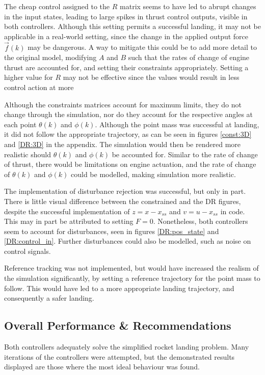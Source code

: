 \documentclass[conference, tikz]{IEEEtran}
\begin{document}
The cheap control assigned to the $R$ matrix seems to have led to abrupt changes in the input states, leading to large spikes in thrust control outputs, visible in both controllers. Although this setting permits a successful landing, it may not be applicable in a real-world setting, since the change in the applied output force $\vec f(k)$ may be dangerous. A way to mitigate this could be to add more detail to the original model, modifying $A$ and $B$ such that the rates of change of engine thrust are accounted for, and setting their constraints appropriately. Setting a higher value for $R$ may not be effective since the values would result in less control action at more 

Although the constraints matrices account for maximum limits, they do not change through the simulation, nor do they account for the respective angles at each point $\theta(k)$ and $\phi(k)$. Although the point mass was successful at landing, it did not follow the appropriate trajectory, as can be seen in figures \ref{const:3D} and \ref{DR:3D} in the appendix. The simulation would then be rendered more realistic should $\theta(k)$ and $\phi(k)$ be accounted for. Similar to the rate of change of thrust, there would be limitations on engine actuation, and the rate of change of $\theta(k)$ and $\phi(k)$ could be modelled, making simulation more realistic. 

The implementation of disturbance rejection was successful, but only in part. There is little visual difference between the constrained and the DR figures, despite the successful implementation of $z = x - x_{ss}$ and $v = u - x_{ss}$ in code. This may in part be attributed to setting $F = 0$. Nonetheless, both controllers seem to account for disturbances, seen in figures \ref{DR:pos_state} and \ref{DR:control_in}. Further disturbances could also be modelled, such as noise on control signals.

Reference tracking was not implemented, but would have increased the realism of the simulation significantly, by setting a reference trajectory for the point mass to follow. This would have led to a more appropriate landing trajectory, and consequently a safer landing. 

\subsection{Overall Performance \& Recommendations}
Both controllers adequately solve the simplified rocket landing problem. Many iterations of the controllers were attempted, but the demonstrated results displayed are those where the most ideal behaviour was found. 
\end{document}
